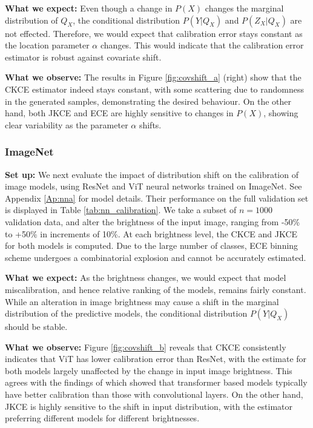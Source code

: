 \documentclass[twocolumn]{article}
\theoremstyle{definition}
\begin{document}
\textbf{What we expect:} Even though a change in $P(X)$ changes the marginal distribution of $Q_X$, the conditional distribution $P(Y|Q_X)$ and $P(Z_X|Q_X)$ are not effected. Therefore, we would expect that calibration error stays constant as the location parameter $\alpha$ changes. This would indicate that the calibration error estimator is robust against covariate shift. 

\textbf{What we observe:} The results in Figure \ref{fig:covshift_a} (right) show that the CKCE estimator indeed stays constant, with some scattering due to randomness in the generated samples, demonstrating the desired behaviour. On the other hand, both JKCE and ECE are highly sensitive to changes in $P(X)$, showing clear variability as the parameter $\alpha$ shifts. 



\subsubsection{ImageNet} \label{sec:covshift_imagenet}

\textbf{Set up:} We next evaluate the impact of distribution shift on the calibration of image models, using ResNet and ViT neural networks trained on ImageNet. See Appendix \ref{Ap:nna} for model details. Their performance on the full validation set is displayed in Table \ref{tab:nn_calibration}. We take a subset of $n=1000$ validation data, and alter the brightness of the input image, ranging from -50\% to +50\% in increments of 10\%. At each brightness level, the CKCE and JKCE for both models is computed. Due to the large number of classes, ECE binning scheme undergoes a combinatorial explosion and cannot be accurately estimated.

\textbf{What we expect:} As the brightness changes, we would expect that model miscalibration, and hence relative ranking of the models, remains fairly constant. While an alteration in image brightness may cause a shift in the marginal distribution of the predictive models, the conditional distribution $P(Y|Q_X)$ should be stable.

\textbf{What we observe:} Figure \ref{fig:covshift_b} reveals that CKCE consistently indicates that ViT has lower calibration error than ResNet, with the estimate for both models largely unaffected by the change in input image brightness. This agrees with the findings of \citet{Minderer_2021_revisiting} which showed that transformer based models typically have better calibration than those with convolutional layers. On the other hand, JKCE is highly sensitive to the shift in input distribution, with the estimator preferring different models for different brightnesses. 
\end{document}
